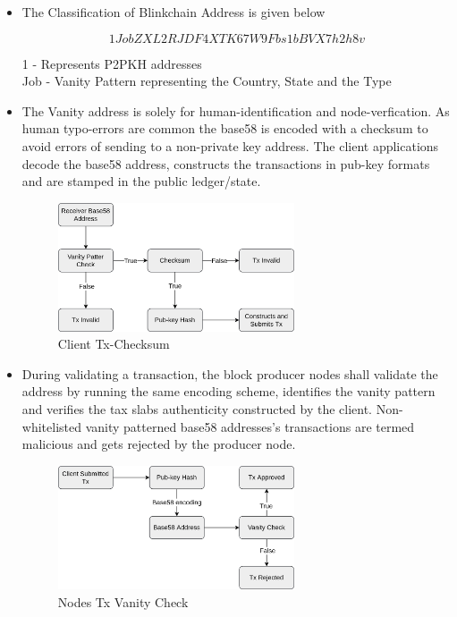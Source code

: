 \documentclass[letterpaper,11pt]{article}
\begin{document}
\begin{itemize}[wide, labelwidth=!, labelindent=0pt]
\item The Classification of Blinkchain Address is given below

\[1JobZXL2RJDF4XTK67W9Fbs1bBVX7h2h8v\]

1 - Represents P2PKH addresses\\
Job - Vanity Pattern representing the Country, State and the Type

\item The Vanity address is solely for human-identification and node-verfication. As human typo-errors are common the base58 is encoded with a checksum to avoid errors of sending to a non-private key address. The client applications decode the base58 address, constructs the transactions in pub-key formats and are stamped in the public ledger/state.

\begin{figure}[H]
\begin{center}
\includegraphics[width=7cm]{clienttxvanity}
\caption{Client Tx-Checksum}
\end{center}
\end{figure}

\item During validating a transaction, the block producer nodes shall validate the address by running the same encoding scheme, identifies the vanity pattern and verifies the tax slabs authenticity constructed by the client. Non-whitelisted vanity patterned base58 addresses's transactions are termed malicious and gets rejected by the producer node.   

\begin{figure}[H]
\begin{center}
\includegraphics[width=7cm]{nodetxvanity}
\caption{Nodes Tx Vanity Check}
\end{center}
\end{figure}

\end{itemize}
\end{document}
